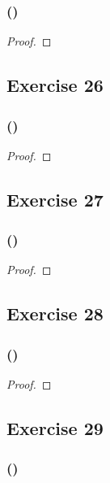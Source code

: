 \documentclass[14pt]{extarticle}
\begin{document}
\subsubsection{()}

\begin{proof}

\end{proof}

\subsection{Exercise 26}

\subsubsection{()}

\begin{proof}

\end{proof}

\subsection{Exercise 27}

\subsubsection{()}

\begin{proof}

\end{proof}

\subsection{Exercise 28}

\subsubsection{()}

\begin{proof}

\end{proof}

\subsection{Exercise 29}

\subsubsection{()}
\end{document}
